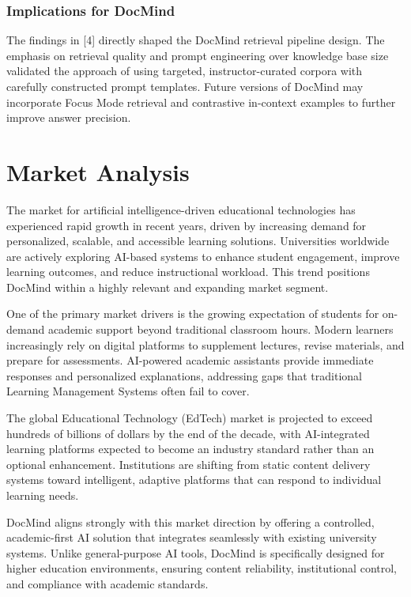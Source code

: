 \documentclass[12pt, a4paper, oneside]{report}
\let\oldsection\section
\renewcommand{\section}{%
  \addtocontents{toc}{\protect\needspace{4\baselineskip}}%
  \oldsection
}
\begin{document}
\newpage

\subsubsection{Implications for DocMind}

The findings in [4] directly shaped the DocMind retrieval pipeline design. The emphasis on retrieval quality and prompt engineering over knowledge base size validated the approach of using targeted, instructor-curated corpora with carefully constructed prompt templates. Future versions of DocMind may incorporate Focus Mode retrieval and contrastive in-context examples to further improve answer precision.

\newpage
\section{Market Analysis}

The market for artificial intelligence-driven educational technologies has experienced rapid growth in recent years, driven by increasing demand for personalized, scalable, and accessible learning solutions. Universities worldwide are actively exploring AI-based systems to enhance student engagement, improve learning outcomes, and reduce instructional workload. This trend positions DocMind within a highly relevant and expanding market segment.

One of the primary market drivers is the growing expectation of students for on-demand academic support beyond traditional classroom hours. Modern learners increasingly rely on digital platforms to supplement lectures, revise materials, and prepare for assessments. AI-powered academic assistants provide immediate responses and personalized explanations, addressing gaps that traditional Learning Management Systems often fail to cover.

The global Educational Technology (EdTech) market is projected to exceed hundreds of billions of dollars by the end of the decade, with AI-integrated learning platforms expected to become an industry standard rather than an optional enhancement. Institutions are shifting from static content delivery systems toward intelligent, adaptive platforms that can respond to individual learning needs.

DocMind aligns strongly with this market direction by offering a controlled, academic-first AI solution that integrates seamlessly with existing university systems. Unlike general-purpose AI tools, DocMind is specifically designed for higher education environments, ensuring content reliability, institutional control, and compliance with academic standards.
\end{document}
